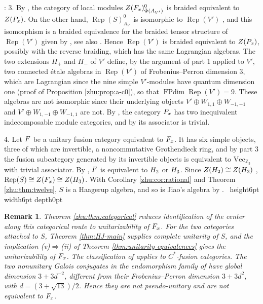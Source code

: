 \documentclass[leqno]{article}
\let\cal\relax
\newcommand{\cal}{\mathcal}
\newcommand{\Z}{\ensuremath{\mathbb{Z}}}
\newcommand{\qed}{\hfill \vrule height6pt  width6pt depth0pt}
\DeclareMathOperator{\Rep}{Rep}
\newtheorem{remark}[thm]{Remark}
\newenvironment{proof}[1][]{\noindent {\it Proof #1} : }{\hbox{~}\qed
\smallskip
}
\numberwithin{equation}{section}
\begin{document}
\begin{proof}
3. By \cite[Proposition 2.2, part 5]{ArhII}, the category of local modules $Z(\cal F_x)^0_{\Phi(A_{V'})}$ is braided equivalent to $Z(\cal P_x)$. On the other hand, $\Rep(S)^0_{A_{V'}}$ is isomorphic to $\Rep(V')$ \cite[Theorem 3.4 p.~16]{HKL15}, and this isomorphism is a braided equivalence for the braided tensor structure of $\Rep(V')$ given by \cite{Hua08} \cite[Theorem 3.65]{CKM24}, see also \cite[p.~5]{CKM22}. Hence $\Rep(V')$ is braided equivalent to $Z(\cal P_x)$, possibly with the reverse braiding, which has the same Lagrangian algebras. The two extensions $H_+$ and $H_-$ of $V'$ define, by the argument of part 1 applied to $V'$, two connected étale algebras in $\Rep(V')$ of Frobenius--Perron dimension $3$, which are Lagrangian since the nine simple $V'$-modules have quantum dimension one (proof of Proposition \ref{zhu:prop:a-c0}), so that $\operatorname{FPdim}\Rep(V') = 9$. These algebras are not isomorphic since their underlying objects $V' \oplus W_{1,1} \oplus W_{-1,-1}$ and $V' \oplus W_{1,-1} \oplus W_{-1,1}$ are not. By \cite[Proposition 2.2, part 2]{ArhII}, the category $\cal P_x$ has two inequivalent indecomposable module categories, and by \cite[Lemma 6.7, part 2]{ArhII} its associator is trivial.

4. Let $\cal F$ be a unitary fusion category equivalent to $\cal F_x$. It has six simple objects, three of which are invertible, a noncommutative Grothendieck ring, and by part 3 the fusion subcategory generated by its invertible objects is equivalent to $\mathrm{Vec}_{\Z_3}$ with trivial associator. By \cite[Theorem 6.1]{ArhII}, $\cal F$ is equivalent to $\cal H_2$ or $\cal H_3$. Since $Z(\cal H_2) \cong Z(\cal H_3)$ \cite[Section 2.1]{ArhII}, $\Rep(S) \cong Z(\cal F_x) \cong Z(\cal H_3)$. With Corollary \ref{zhu:cor:rational} and Theorem \ref{zhu:thm:twelve}, $S$ is a Haagerup algebra, and so is Jiao's algebra by \cite[Theorem 10.24]{Arh26}.
\end{proof}

\begin{remark}\normalfont
\label{zhu:rem:unitarity-gap}
Theorem \ref{zhu:thm:categorical} reduces identification of the center along this categorical route to unitarizability of $\cal F_x$. For the two categories attached to $S$, Theorem \ref{thm:HJ-main} supplies complete unitarity of $S$, and the implication \textup{(v)}$\Rightarrow$\textup{(ii)} of Theorem \ref{thm:unitarity-equivalences} gives the unitarizability of $\cal F_x$. The classification of \cite[Theorems 5.9 and 9.1]{Izu18} applies to $C^*$-fusion categories. The two nonunitary Galois conjugates in the endomorphism family of \cite[Theorem 3]{EvG17} have global dimension $3+3d^{-2}$, different from their Frobenius--Perron dimension $3+3d^2$, with $d=(3+\sqrt{13})/2$. Hence they are not pseudo-unitary and are not equivalent to $\cal F_x$.
\end{remark}
\end{document}
